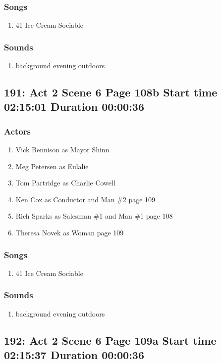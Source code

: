 \subsubsection{Songs}
\begin{enumerate}
\item 41 Ice Cream Sociable
\end{enumerate}\subsubsection{Sounds}
\begin{enumerate}
\item background evening outdoors
\end{enumerate}
\subsection{191: Act 2 Scene 6 Page 108b Start time 02:15:01 Duration 00:00:36}

\subsubsection{Actors}
\begin{enumerate}
\item Vick Bennison as Mayor Shinn
\item Meg Petersen as Eulalie
\item Tom Partridge as Charlie Cowell
\item Ken Cox as Conductor and Man \#2 page 109
\item Rich Sparks as Salesman \#1 and Man \#1 page 108
\item Theresa Novek as Woman page 109
\end{enumerate}

\subsubsection{Songs}
\begin{enumerate}
\item 41 Ice Cream Sociable
\end{enumerate}\subsubsection{Sounds}
\begin{enumerate}
\item background evening outdoors
\end{enumerate}
\subsection{192: Act 2 Scene 6 Page 109a Start time 02:15:37 Duration 00:00:36}
